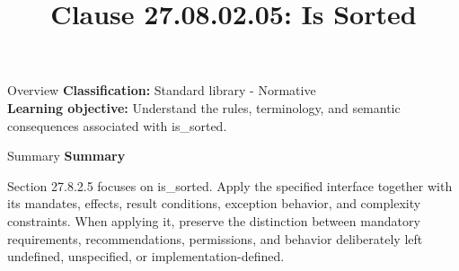 \documentclass[10pt,letterpaper]{article}
\title{Clause 27.08.02.05: Is Sorted}
\author{}
\date{}
\begin{document}
\maketitle
\begin{CornellOverviewBox}{Overview}
\textbf{Classification:} Standard library - Normative\\[2pt]
\textbf{Learning objective:} Understand the rules, terminology, and semantic consequences associated with is\_sorted.
\end{CornellOverviewBox}\begin{CornellSummaryBox}{Summary}
{\sffamily\bfseries\color{Accent} Summary}\par\vspace{3pt}Section 27.8.2.5 focuses on is\_sorted. Apply the specified interface together with its mandates, effects, result conditions, exception behavior, and complexity constraints. When applying it, preserve the distinction between mandatory requirements, recommendations, permissions, and behavior deliberately left undefined, unspecified, or implementation-defined.
\end{CornellSummaryBox}
\end{document}
